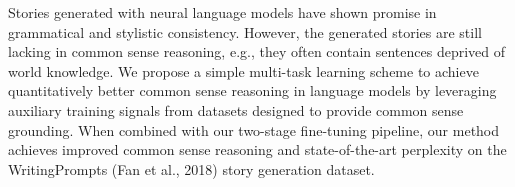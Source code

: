 Stories generated with neural language models have shown promise in grammatical and stylistic consistency. However, the generated stories are still lacking in common sense reasoning, e.g., they often contain sentences deprived of world knowledge. We propose a simple multi-task learning scheme to achieve quantitatively better common sense reasoning in language models by leveraging auxiliary training signals from datasets designed to provide common sense grounding. When combined with our two-stage fine-tuning pipeline, our method achieves improved common sense reasoning and state-of-the-art perplexity on the WritingPrompts (Fan  et  al., 2018) story generation dataset.